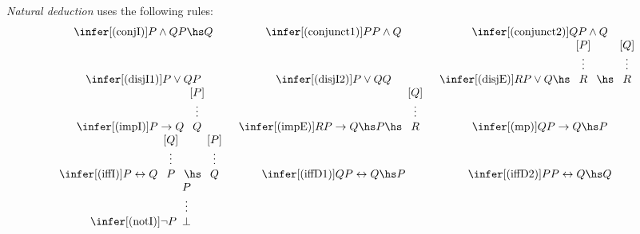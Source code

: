 \documentclass{article}
\begin{document}
\begin{definition}
    \emph{Natural deduction} uses the following rules:
    \begin{align*}
        \begin{array}{c c c}
            \infer[(\text{conjI})]{P\wedge Q}{P\hs Q} &
            \infer[(\text{conjunct1})]{P}{P\wedge Q} &
            \infer[(\text{conjunct2})]{Q}{P\wedge Q} \\
            \infer[(\text{disjI1})]{P\vee Q}{P} &
            \infer[(\text{disjI2})]{P\vee Q}{Q} &
            \infer[(\text{disjE})]{R}{P\vee Q \hs \begin{array}[b]{c}
                [P]\\ \vdots \\ R
            \end{array}
            \hs \begin{array}[b]{c}
                [Q]\\ \vdots \\ R
            \end{array}}\\
            \infer[(\text{impI})]{P\to Q}{\begin{array}[b]{c}
                [P]\\\vdots\\Q 
            \end{array}} &
            \infer[(\text{impE})]{R}{P\to Q\hs P \hs \begin{array}[b]{c}
                [Q]\\\vdots\\R
            \end{array}}&
            \infer[(\text{mp})]{Q}{P\to Q\hs P}\\
            \infer[(\text{iffI})]{P\leftrightarrow Q}{\begin{array}[b]{c}
                [Q]\\\vdots\\P
            \end{array}\hs\begin{array}[b]{c}
                [P]\\\vdots\\Q
            \end{array}} &
            \infer[(\text{iffD1})]{Q}{P\leftrightarrow Q\hs P}&
            \infer[(\text{iffD2})]{P}{P\leftrightarrow Q\hs Q}\\
            \infer[(\text{notI})]{\neg P}{\begin{array}[b]{c}
                P \\ \vdots \\ \bot

\end{array}}
\end{array}
\end{align*}
\end{definition}
\end{document}
